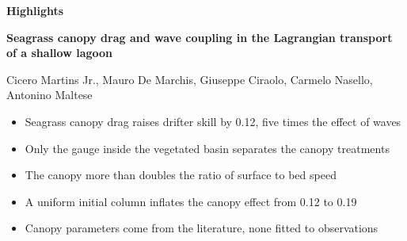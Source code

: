 \documentclass[11pt]{article}
\begin{document}
\begin{center}
{\large\bfseries Highlights}
\end{center}

\vspace{0.4cm}

\textbf{Seagrass canopy drag and wave coupling in the Lagrangian transport of a shallow lagoon}

Cicero Martins Jr., Mauro De Marchis, Giuseppe Ciraolo, Carmelo Nasello, Antonino Maltese

\vspace{0.6cm}

\begin{itemize}[leftmargin=1.2em, itemsep=0.5em]
  \item Seagrass canopy drag raises drifter skill by 0.12, five times the effect of waves
  \item Only the gauge inside the vegetated basin separates the canopy treatments
  \item The canopy more than doubles the ratio of surface to bed speed
  \item A uniform initial column inflates the canopy effect from 0.12 to 0.19
  \item Canopy parameters come from the literature, none fitted to observations
\end{itemize}
\end{document}
